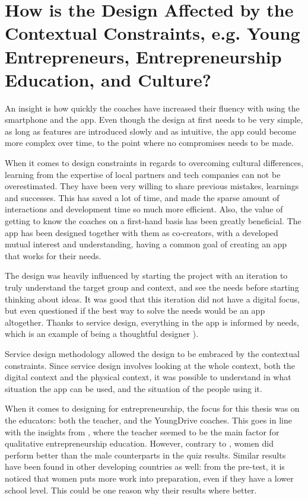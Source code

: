 
\section{How is the Design Affected by the Contextual Constraints, e.g. Young Entrepreneurs, Entrepreneurship Education, and Culture?} %

  An insight is how quickly the coaches have increased their fluency with using the smartphone and the app. Even though the design at first needs to be very simple, as long as features are introduced slowly and as intuitive, the app could become more complex over time, to the point where no compromises needs to be made.

  When it comes to design constraints in regards to overcoming cultural differences, learning from the expertise of local partners and tech companies can not be overestimated. They have been very willing to share previous mistakes, learnings and successes. This has saved a lot of time, and made the sparse amount of interactions and development time so much more efficient. Also, the value of getting to know the coaches on a first-hand basis has been greatly beneficial. The app has been designed together with them as co-creators, with a developed mutual interest and understanding, having a common goal of creating an app that works for their needs.

  The design was heavily influenced by starting the project with an iteration to truly understand the target group and context, and see the needs before starting thinking about ideas. It was good that this iteration did not have a digital focus, but even questioned if the best way to solve the needs would be an app altogether. Thanks to service design, everything in the app is informed by needs, which is an example of being a thoughtful designer \citep{lowgren} \citep{stickdorn}).

  Service design methodology allowed the design to be embraced by the contextual constraints. Since service design involves looking at the whole context, both the digital context and the physical context, it was possible to understand in what situation the app can be used, and the situation of the people using it.

  When it comes to designing for entrepreneurship, the focus for this thesis was on the educators: both the teacher, and the YoungDrive coaches. This goes in line with the insights from \cite{ruskovaara}, where the teacher seemed to be the main factor for qualitative entrepreneurship education. However, contrary to \cite{ruskovaara}, women did perform better than the male counterparts in the quiz results. Similar results have been found in other developing countries as well: from the pre-test, it is noticed that women puts more work into preparation, even if they have a lower school level. This could be one reason why their results where better.

